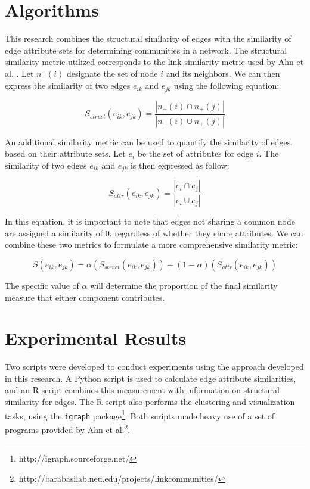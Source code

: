\documentclass{report} %
\begin{document}
\section*{Algorithms}

This research combines the structural similarity of edges with the similarity of edge attribute sets for determining communities in a network. The structural similarity metric utilized corresponds to the link similarity metric used by Ahn et al. \cite{ahn-lehmann-link-communities-nature-2010}. Let $n_+(i)$ designate the set of node $i$ and its neighbors. We can then express the similarity of two edges $e_{ik}$ and $e_{jk}$ using the following equation:

\begin{equation}
  S_{struct}(e_{ik},e_{jk}) = \frac{|n_+(i) \cap n_+(j)|}{|n_+(i) \cup n_+(j)|}
\end{equation}

An additional similarity metric can be used to quantify the similarity of edges, based on their attribute sets. Let $e_i$ be the set of attributes for edge $i$. The similarity of two edges $e_{ik}$ and $e_{jk}$ is then expressed as follow:

\begin{equation}
  S_{attr}(e_{ik},e_{jk}) = \frac{|e_i \cap e_j|}{|e_i \cup e_j|}
\end{equation}

In this equation, it is important to note that edges not sharing a common node are assigned a similarity of 0, regardless of whether they share attributes. We can combine these two metrics to formulate a more comprehensive similarity metric:

\begin{equation}
  S(e_{ik},e_{jk}) = \alpha (S_{struct}(e_{ik},e_{jk})) + (1-\alpha)(S_{attr}(e_{ik},e_{jk}))
\end{equation}

The specific value of $\alpha$ will determine the proportion of the final similarity measure that either component contributes.

\section*{Experimental Results}

Two scripts were developed to conduct experiments using the approach developed in this research. A Python script is used to calculate edge attribute similarities, and an R script combines this measurement with information on structural similarity for edges. The R script also performs the clustering and visualization tasks, using the \texttt{igraph} package\footnote{http://igraph.sourceforge.net/}. Both scripts made heavy use of a set of programs provided by Ahn et al.\footnote{http://barabasilab.neu.edu/projects/linkcommunities/}.\\
\end{document}
